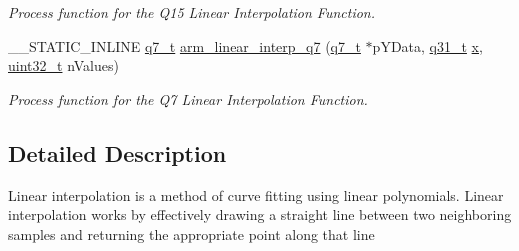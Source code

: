 \begin{DoxyCompactItemize}
\begin{DoxyCompactList}\small\item\em Process function for the Q15 Linear Interpolation Function. \end{DoxyCompactList}\item 
\-\_\-\-\_\-\-S\-T\-A\-T\-I\-C\-\_\-\-I\-N\-L\-I\-N\-E \hyperlink{arm__math_8h_ae541b6f232c305361e9b416fc9eed263}{q7\-\_\-t} \hyperlink{group___linear_interpolate_ga40267c9835983a9631d933f55814ba47}{arm\-\_\-linear\-\_\-interp\-\_\-q7} (\hyperlink{arm__math_8h_ae541b6f232c305361e9b416fc9eed263}{q7\-\_\-t} $\ast$p\-Y\-Data, \hyperlink{arm__math_8h_adc89a3547f5324b7b3b95adec3806bc0}{q31\-\_\-t} \hyperlink{pios__opahrs__proto_8h_ad0da36b2558901e21e7a30f6c227a45e}{x}, \hyperlink{stdint_8h_a435d1572bf3f880d55459d9805097f62}{uint32\-\_\-t} n\-Values)
\begin{DoxyCompactList}\small\item\em Process function for the Q7 Linear Interpolation Function. \end{DoxyCompactList}\end{DoxyCompactItemize}


\subsection{Detailed Description}
Linear interpolation is a method of curve fitting using linear polynomials. Linear interpolation works by effectively drawing a straight line between two neighboring samples and returning the appropriate point along that line

